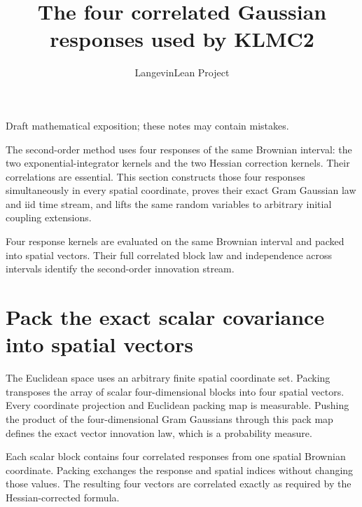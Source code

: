 \documentclass[11pt,a4paper]{article}
\title{\texorpdfstring{The four correlated Gaussian responses used by KLMC2}{The four correlated Gaussian responses used by KLMC2}}
\author{LangevinLean Project}
\date{}
\begin{document}
\maketitle
Draft mathematical exposition; these notes may contain mistakes.


The second-order method uses four responses of the same Brownian interval: the two exponential-integrator kernels and the two Hessian correction kernels. Their correlations are essential. This section constructs those four responses simultaneously in every spatial coordinate, proves their exact Gram Gaussian law and iid time stream, and lifts the same random variables to arbitrary initial coupling extensions.



Four response kernels are evaluated on the same Brownian interval and packed into spatial vectors. Their full correlated block law and independence across intervals identify the second-order innovation stream.


\section{\texorpdfstring{Pack the exact scalar covariance into spatial vectors}{Pack the exact scalar covariance into spatial vectors}}


The Euclidean space uses an arbitrary finite spatial coordinate set. Packing transposes the array of scalar four-dimensional blocks into four spatial vectors. Every coordinate projection and Euclidean packing map is measurable. Pushing the product of the four-dimensional Gram Gaussians through this pack map defines the exact vector innovation law, which is a probability measure.



Each scalar block contains four correlated responses from one spatial Brownian coordinate. Packing exchanges the response and spatial indices without changing those values. The resulting four vectors are correlated exactly as required by the Hessian-corrected formula.
\end{document}
